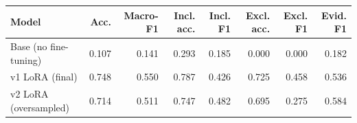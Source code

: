 \begin{tabular}{lrrrrrrr}\toprule
Model & Acc. & Macro-F1 & Incl. acc. & Incl. F1 & Excl. acc. & Excl. F1 & Evid. F1 \\ \midrule
Base (no fine-tuning) & 0.107 & 0.141 & 0.293 & 0.185 & 0.000 & 0.000 & 0.182 \\
v1 LoRA (final) & 0.748 & 0.550 & 0.787 & 0.426 & 0.725 & 0.458 & 0.536 \\
v2 LoRA (oversampled) & 0.714 & 0.511 & 0.747 & 0.482 & 0.695 & 0.275 & 0.584 \\
\bottomrule\end{tabular}